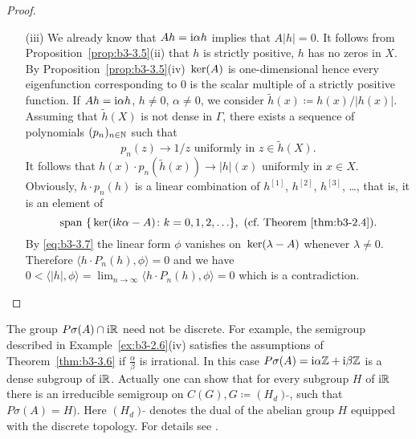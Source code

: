\begin{proof}
\begin{enumerate}[wide, labelindent=.5em]
	\item[(iii)] 
	We already know that $Ah = \mathrm{i}\alpha h$ implies that $A|h| = 0$.
	It follows from Proposition~\ref{prop:b3-3.5}(ii) that $h$ is strictly positive, \ie $h$ has no zeros in $X$.
	By Proposition~\ref{prop:b3-3.5}(iv) $\mathop{}\mathrm{ker}(A)$ is one-dimensional hence every
	eigenfunction corresponding to $0$ is the scalar multiple of a strictly positive function.
	If $Ah = \mathrm{i}\alpha h$, $h \neq 0$, $\alpha \neq 0$, we consider $\tilde{h}(x) \coloneq h(x)/|h(x)|$.
	Assuming that $\tilde{h}(X)$ is not dense in $\Gamma$, there exists a sequence of polynomials $(p_{n})_{n\in\mathbb{N}}$ such that
	\begin{equation}\label{eq:b3-3.8}
		p_{n}(z) \to 1/z \text{ uniformly in } z \in \tilde{h}(X).
	\end{equation}
	It follows that $h(x)\cdot p_{n}(\tilde{h}(x)) \to |h|(x)$ uniformly in $x \in X$.
	Obviously, $h\cdot p_{n}(h)$ is a linear combination of $h^{[1]}$, $h^{[2]}$, $h^{[3]}$, \ldots, that is, it is an element of
	\[
	\text{span $\{\Kern{ \im k\alpha - A} \colon  k=0,1,2,\ldots \}$}, \  \text{(cf.\ Theorem~\ref{thm:b3-2.4})}.
	\]
	By \eqref{eq:b3-3.7} the linear form $\phi$ vanishes on $\mathop{}\mathrm{ker}(\lambda - A)$ whenever $\lambda \neq 0$.
	Therefore $\langle h\cdot P_{n}(h),\phi\rangle = 0$ and we have $0 < \langle|h|,\phi\rangle = \lim_{n\to\infty}\langle h\cdot P_{n}(h),\phi\rangle = 0$ which is a contradiction.
	\end{enumerate}
\end{proof}
The group $P\sigma(A) \cap \mathrm{i}\mathbb{R}$ need not be discrete. 
For example, the semigroup described in Example~\ref{ex:b3-2.6}(iv) satisfies the assumptions of Theorem~\ref{thm:b3-3.6} if $\frac{\alpha}{\beta}$ is irrational. 
In this case $P\sigma(A) = \mathrm{i}\alpha \mathbb{Z} + \mathrm{i}\beta \mathbb{Z}$ is a dense subgroup of $\mathrm{i} \mathbb{R}$. 
Actually one can show that for every subgroup $H$ of $\mathrm{i} \mathbb{R}$ there is an irreducible semigroup on $C(G), G \coloneqq (H_d)\,{\tilde{ }}$, such that $P\sigma(A) = H)$. 
Here $(H_d)\,{\tilde{ }}$ denotes the dual of the abelian group $H$ equipped with the discrete topology. 
For details see \citet[p.62]{greiner:1982}. 

